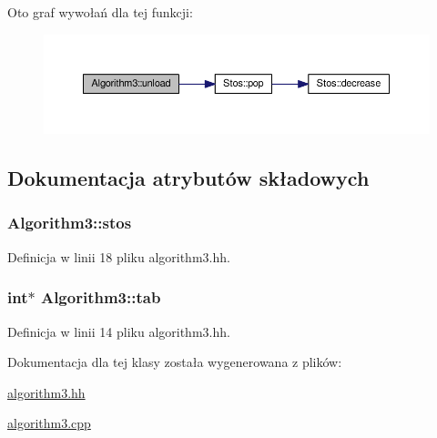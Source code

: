 Oto graf wywołań dla tej funkcji\-:\nopagebreak
\begin{figure}[H]
\begin{center}
\leavevmode
\includegraphics[width=350pt]{class_algorithm3_a170d77ee28866741214e65da7efcf533_cgraph}
\end{center}
\end{figure}




\subsection{Dokumentacja atrybutów składowych}
\hypertarget{class_algorithm3_afbbe5f5bd47a6af1a83065319ad5d36a}{
\subsubsection[{stos}]{ Algorithm3\-::stos\hspace{0.3cm}{\ttfamily [private]}}}\label{class_algorithm3_afbbe5f5bd47a6af1a83065319ad5d36a}


Definicja w linii 18 pliku algorithm3.\-hh.

\hypertarget{class_algorithm3_a6f4c026b294ca292bd7ea6713f9b102a}{
\subsubsection[{tab}]{\setlength{\rightskip}{0pt plus 5cm}int$\ast$ Algorithm3\-::tab\hspace{0.3cm}{\ttfamily [private]}}}\label{class_algorithm3_a6f4c026b294ca292bd7ea6713f9b102a}


Definicja w linii 14 pliku algorithm3.\-hh.



Dokumentacja dla tej klasy została wygenerowana z plików\-:\begin{DoxyCompactItemize}
\item 
\hyperlink{algorithm3_8hh}{algorithm3.\-hh}\item 
\hyperlink{algorithm3_8cpp}{algorithm3.\-cpp}\end{DoxyCompactItemize}
